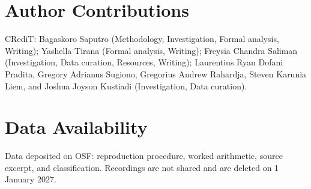 \documentclass[conference]{IEEEtran}
\begin{document}
\section*{Author Contributions}

CRediT: Bagaskoro Saputro (Methodology, Investigation, Formal analysis, Writing); Yashella Tirana
(Formal analysis, Writing); Freysia Chandra Saliman (Investigation, Data curation, Resources,
Writing); Laurentius Ryan Dofani Pradita, Gregory Adrianus Sugiono, Gregorius Andrew Rahardja, Steven
Karunia Liem, and Joshua Joyson Kustiadi (Investigation, Data curation).

\section*{Data Availability}

Data deposited on OSF: reproduction procedure, worked arithmetic, source excerpt, and classification.
Recordings are not shared and are deleted on 1 January 2027.
\end{document}
